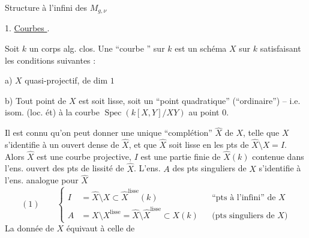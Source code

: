 Structure à l'infini des $M_{g,\nu}$

1. \uline{Courbes }.

Soit $k$ un corps alg. clos. Une ``courbe '' sur $k$ est un schéma $X$ sur $k$ satisfaisant les conditions suivantes :

a) $X$ quasi-projectif,  de dim $1$

b) Tout point de $X$ est soit lisse, soit un ``point quadratique'' (``ordinaire'') -- i.e. isom. (loc. ét) à la courbe $\operatorname{Spec}(k[X,Y]/XY)$ au point $0$.

Il est connu qu'on peut donner une unique ``complétion'' $\widehat X$ de $X$, telle que  $X$ s'identifie à un ouvert dense de $\widehat X$, et que $\widehat X$ soit lisse en les pts de $\widehat X\setminus X=I$. Alors $\widehat X$ est une courbe projective, $I$ est  une partie finie de $\widehat X(k)$ contenue dans l'ens. ouvert des pts de lissité de $\widehat X$. L'ens. $A$ des pts singuliers de $X$ s'identifie à l'ens. analogue pour $\widehat X$
\[
(1)\qquad
\left\{\begin{aligned}
I&=\widehat X\setminus X\subset\widehat X^{\mathrm{lisse}}(k)
&&\text{``pts à l'infini'' de }X\\
A&=X\setminus X^{\mathrm{lisse}}=\widehat X\setminus\widehat X^{\mathrm{lisse}}\subset X(k)
&&\text{(pts singuliers de }X\text{)}
\end{aligned}\right.
\]
La donnée de $X$ équivaut à celle de
